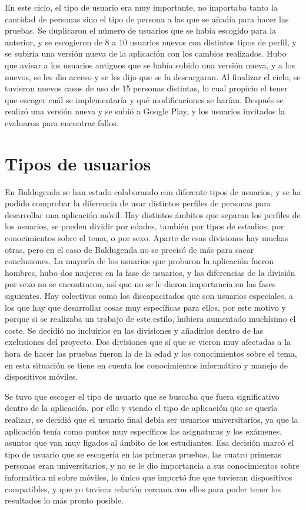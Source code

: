 En este ciclo, el tipo de usuario era muy importante, no importaba tanto la cantidad de personas sino el tipo de persona a las que se añadía para hacer las pruebas.
Se duplicaron el número de usuarios que se había escogido para la anterior, y se escogieron de 8 a 10 usuarios nuevos con distintos tipos de perfil, y se subiría una versión nueva de la aplicación con los cambios realizados.
Hubo que avisar a los usuarios antiguos que se había subido una versión nueva, y a los nuevos, se les dio acceso y se les dijo que se la descargaran.
Al finalizar el ciclo, se tuvieron nuevos casos de uso de 15 personas distintas, lo cual propicio el tener que escoger cuál se implementaría y qué modificaciones se harían.
Después se realizó una versión nueva y se subió a Google Play, y los usuarios invitados la evaluaron para encontrar fallos.



\section{Tipos de usuarios}
\label{secc:tipo de usuarios}

En Baldugenda se han estado colaborando con diferente tipos de usuarios, y se ha podido comprobar la diferencia de usar distintos perfiles de personas para desarrollar una aplicación móvil.
Hay distintos ámbitos que separan los perfiles de los usuarios, se pueden dividir por edades, también por tipos de estudios, por conocimientos sobre el tema, o por sexo.
Aparte de esas divisiones hay muchas otras, pero en el caso de Baldugenda no se precisó de más para sacar conclusiones.
La mayoría de los usuarios que probaron la aplicación fueron hombres, hubo dos mujeres en la fase de usuarios, y las diferencias de la división por sexo no se encontraron, así que no se le dieron importancia en las fases siguientes.
Hay colectivos como los discapacitados que son usuarios especiales, a los que hay que desarrollar cosas muy específicas para ellos, por este motivo y porque si se realizaba un trabajo de este estilo, hubiera aumentado muchísimo el coste. Se decidió no incluirlos en las divisiones y añadirlos dentro de las exclusiones del proyecto.
Dos divisiones que sí que se vieron muy afectadas a la hora de hacer las pruebas fueron la de la edad y los conocimientos sobre el tema, en esta situación se tiene en cuenta los conocimientos informático y manejo de dispositivos móviles.

Se tuvo que escoger el tipo de usuario que se buscaba que fuera significativo dentro de la aplicación, por ello y viendo el tipo de aplicación que se quería realizar, se decidió que el usuario final debía ser usuarios universitarios, ya que la aplicación tenía como puntos muy específicos las asignaturas y los exámenes, asuntos que van muy ligados al ámbito de los estudiantes.
Esa decisión marcó el tipo de usuario que se escogería en las primeras pruebas, las cuatro primeras personas  eran universitarios, y no se le dio importancia a sus conocimientos sobre informática ni sobre móviles, lo único que importó fue que tuvieran dispositivos compatibles, y que yo tuviera relación cercana con ellos para poder tener los resultados lo más pronto posible.

